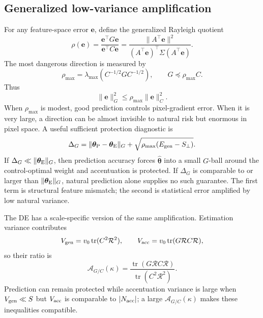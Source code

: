 \documentclass[11pt]{article}
\newcommand{\tr}{\operatorname{tr}}
\newcommand{\that}{\widehat{\bm\theta}}
\begin{document}
\subsection{Generalized low-variance amplification}

For any feature-space error $\bm e$, define the generalized Rayleigh quotient
\begin{equation}
  \rho(\bm e)
  =\frac{\bm e^{\top}G\bm e}{\bm e^{\top}C\bm e}
  =\frac{\lVert A^{\top}\bm e\rVert^2}
         {(A^{\top}\bm e)^{\top}\Sigma(A^{\top}\bm e)}.
  \label{eq:generalized-control-rayleigh}
\end{equation}
The most dangerous direction is measured by
\begin{equation}
  \rho_{\max}
  =\lambda_{\max}(C^{-1/2}GC^{-1/2}),
  \qquad G\preceq\rho_{\max}C.
  \label{eq:max-control-amplification}
\end{equation}
Thus
\begin{equation}
  \lVert\bm e\rVert_G^2
  \leq\rho_{\max}\lVert\bm e\rVert_C^2.
\end{equation}
When $\rho_{\max}$ is modest, good prediction controls pixel-gradient error.
When it is very large, a direction can be almost invisible to natural risk
but enormous in pixel space.  A useful sufficient protection diagnostic is
\begin{equation}
  \Delta_G
  =\lVert\bm\theta_{\rm P}-\bm\theta_{\rm E}\rVert_G
   +\sqrt{\rho_{\max}(E_{\rm gen}-S_{\perp})}.
  \label{eq:control-protection-radius}
\end{equation}
If $\Delta_G\ll\lVert\bm\theta_{\rm E}\rVert_G$, then prediction accuracy
forces $\that$ into a small $G$-ball around the control-optimal weight and
accentuation is protected.  If $\Delta_G$ is comparable to or larger than
$\lVert\bm\theta_{\rm E}\rVert_G$, natural prediction alone supplies no such
guarantee.  The first term is structural feature mismatch; the second is
statistical error amplified by low natural variance.

The DE has a scale-specific version of the same amplification.  Estimation
variance contributes
\begin{equation}
  V_{\rm gen}=v_0\tr(C^2\mathcal R^2),
  \qquad
  V_{\rm acc}=v_0\tr(G\mathcal R C\mathcal R),
\end{equation}
so their ratio is
\begin{equation}
  \mathcal A_{G/C}(\kappa)
  =\frac{\tr(G\mathcal R C\mathcal R)}
         {\tr(C^2\mathcal R^2)}.
  \label{eq:de-control-amplification}
\end{equation}
Prediction can remain protected while accentuation variance is large when
$V_{\rm gen}\ll S$ but
$V_{\rm acc}$ is comparable to $|N_{\rm acc}|$; a large
$\mathcal A_{G/C}(\kappa)$ makes these inequalities compatible.
\end{document}
